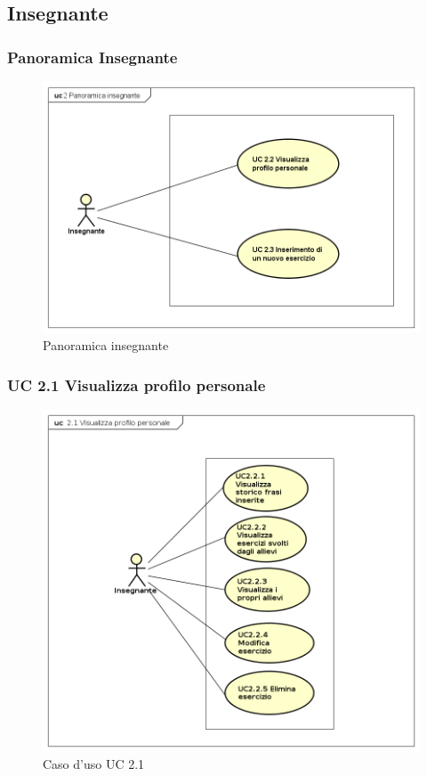 
\subsection{Insegnante}

\subsubsection{Panoramica Insegnante}

\begin{figure}[H]
\centering
\includegraphics[width=14cm]{img/PanoramicaInsegnanti.png} 
\caption{Panoramica insegnante}
\end{figure}


\subsubsection{UC 2.1 Visualizza profilo personale}

\begin{figure}[H]
\centering
\includegraphics[width=14cm]{img/UC21.png} 
\caption{Caso d'uso UC 2.1}
\end{figure}

